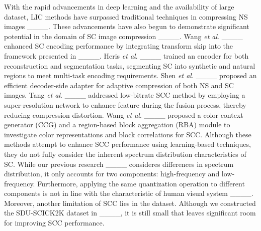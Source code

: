 With the rapid advancements in deep learning and the availability of large dataset, LIC methods have surpassed traditional techniques in compressing NS images ____. These advancements have also begun to demonstrate significant potential in the domain of SC image compression ____. Wang \textit{et al}. ____ enhanced SC encoding performance by integrating transform skip into the framework presented in ____. Heris \textit{et al}. ____ trained an encoder for both reconstruction and segmentation tasks, segmenting SC into synthetic and natural regions to meet multi-task encoding requirements. Shen \textit{et al}. ____ proposed an efficient decoder-side adapter for adaptive compression of both NS and SC images. Tang \textit{et al}. ____ addressed low-bitrate SCC method by employing a super-resolution network to enhance feature during the fusion process, thereby reducing compression distortion. Wang \textit{et al}. ____ proposed a color context generator (CCG) and a region-based block aggregation (RBA) module to investigate color representations
and block correlations for SCC. Although these methods attempt to enhance SCC performance using learning-based techniques, they do not fully consider the inherent spectrum distribution characteristics of SC. While our previous research ____ consideres differences in spectrum distribution, it only accounts for two components: high-frequency and low-frequency. Furthermore, applying the same quantization operation to different components is not in line with the characteristic of human visual system ____. Moreover, another limitation of SCC lies in the dataset. Although we constructed the SDU-SCICK2K dataset in ____, it is still small that leaves significant room for improving SCC performance.

